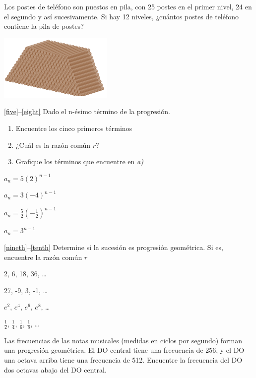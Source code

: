 \documentclass[10pt,twoside]{article}
\begin{document}
\begin{enumerate}
\begin{minipage}{.45\textwidth}
\item Los postes de teléfono son puestos en pila, con 25 postes en el primer nivel, 24 en el segundo y así sucesivamente. Si hay 12 niveles, ¿cuántos postes de teléfono contiene la pila de postes?
\end{minipage}\hfill
\begin{minipage}{.45\textwidth}
\includegraphics[scale=.9]{Images/postes.png} 
\end{minipage}
\ref{five}--\ref{eight} Dado el n-ésimo término de la progresi\'{o}n.
\begin{enumerate}
\item Encuentre los cinco primeros t\'{e}rminos
\item ¿Cu\'{a}l es la raz\'{o}n com\'{u}n $r$?
\item Grafique los t\'{e}rminos que encuentre en \textit{a)}
\end{enumerate}
\begin{multicols}{2}
\item $a_{n}=5(2)^{n-1}$\label{five}
\item $a_{n}=3(-4)^{n-1}$
\item $a_{n}=\frac{5}{2}\left(-\frac{1}{2}\right)^{n-1}$
\item $a_{n}=3^{n-1}$\label{eight}
\end{multicols}
\ref{nineth}--\ref{tenth} Determine si la sucesión es progresión geométrica. Si es, encuentre la razón común $r$
 \begin{multicols}{2}
\item 2, 6, 18, 36, \ldots \label{nineth}
\item 27, -9, 3, -1, \ldots
\item $e^{2}$, $e^{4}$, $e^{6}$, $e^{8}$, \ldots
\item $\frac{1}{2}$, $\frac{1}{4}$, $\frac{1}{6}$, $\frac{1}{8}$, \ldots \label{tenth}
 \end{multicols}
\item Las frecuencias de las notas musicales (medidas en ciclos por segundo) forman una progresión geométrica. El DO central tiene una frecuencia de 256, y el DO una octava arriba tiene una frecuencia de 512. Encuentre la frecuencia del DO dos octavas abajo del DO central.

\end{enumerate}
\end{document}
